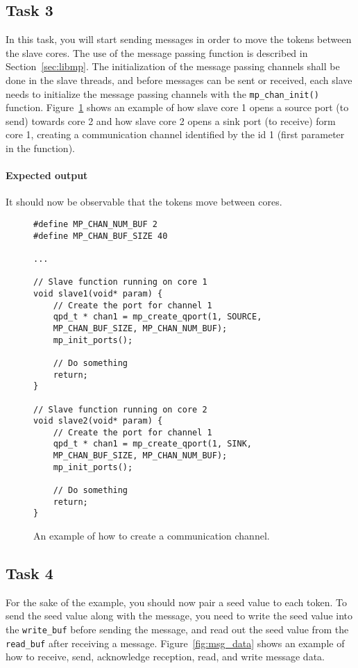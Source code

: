 \documentclass[a4paper,fontsize=10pt,twoside,DIV15,BCOR12mm,headinclude=true,footinclude=false,pagesize,bibtotoc]{scrbook}
\newcommand{\code}[1]{{\texttt{#1}}}
\begin{document}
\subsection{Task 3}
In this task, you will start sending messages in order to move the tokens between the slave cores.
The use of the message passing function is described in Section~\ref{sec:libmp}.
The initialization of the message passing channels shall be done in the slave threads, and before messages can be sent or received, each slave needs to initialize the message passing channels with the \code{mp\_chan\_init()} function.
Figure~\ref{fig:open_channel} shows an example of how slave core 1 opens a source port (to send) towards core 2 and how slave core 2 opens a sink port (to receive) form core 1, creating a communication channel identified by the id 1 (first parameter in the function).

\paragraph*{Expected output}
It should now be observable that the tokens move between cores.

\begin{figure}
\begin{Verbatim}[xleftmargin=1cm,xrightmargin=1cm,frame=single,framesep=3mm]
#define MP_CHAN_NUM_BUF 2
#define MP_CHAN_BUF_SIZE 40

...

// Slave function running on core 1
void slave1(void* param) {
    // Create the port for channel 1
    qpd_t * chan1 = mp_create_qport(1, SOURCE, 
    MP_CHAN_BUF_SIZE, MP_CHAN_NUM_BUF);
    mp_init_ports();

    // Do something
    return;
}

// Slave function running on core 2
void slave2(void* param) {
    // Create the port for channel 1
    qpd_t * chan1 = mp_create_qport(1, SINK, 
    MP_CHAN_BUF_SIZE, MP_CHAN_NUM_BUF);
    mp_init_ports();

    // Do something
    return;
}
\end{Verbatim}
\caption{\label{fig:open_channel}An example of how to create a communication channel.}
\end{figure}


\subsection{Task 4}
For the sake of the example, you should now pair a seed value to each token.
To send the seed value along with the message, you need to write the seed value into
the \code{write\_buf} before sending the message, and read out the seed value from the \code{read\_buf}
after receiving a message.
Figure~\ref{fig:msg_data} shows an example of how to receive, send, acknowledge reception, read, and write message data.
\end{document}
